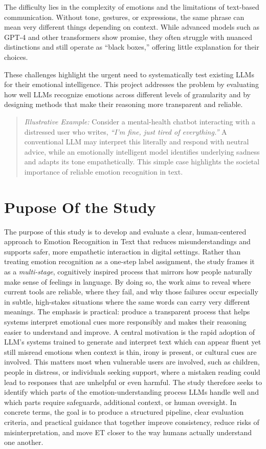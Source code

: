 \noindent The difficulty lies in the complexity of emotions and the limitations of text-based communication. Without tone, gestures, or expressions, the same phrase can mean very different things depending on context. While advanced models such as GPT-4 and other transformers show promise, they often struggle with nuanced distinctions and still operate as “black boxes,” offering little explanation for their choices.  

\noindent These challenges highlight the urgent need to systematically test existing LLMs for their emotional intelligence. This project addresses the problem by evaluating how well LLMs recognize emotions across different levels of granularity and by designing methods that make their reasoning more transparent and reliable.  

\begin{quote}
\textit{Illustrative Example:} Consider a mental-health chatbot interacting with a distressed user who writes, 
\textit{“I’m fine, just tired of everything.”} 
A conventional LLM may interpret this literally and respond with neutral advice, 
while an emotionally intelligent model identifies underlying sadness and adapts its tone empathetically. 
This simple case highlights the societal importance of reliable emotion recognition in text.
\end{quote}


\section{Pupose Of the Study}
The purpose of this study is to develop and evaluate a clear, human-centered approach to Emotion Recognition in Text  that reduces misunderstandings and supports safer, more empathetic interaction in digital settings. Rather than treating emotion recognition as a one-step label assignment, the study frames it as a \textit{multi-stage}, cognitively inspired process that mirrors how people naturally make sense of feelings in language. By doing so, the work aims to reveal where current tools are reliable, where they fail, and why those failures occur especially in subtle, high-stakes situations where the same words can carry very different meanings. The emphasis is practical: produce a transparent process that helps systems interpret emotional cues more responsibly and makes their reasoning easier to understand and improve.
\smallskip
\noindent A central motivation is the rapid adoption of LLM's systems trained to generate and interpret text which can appear fluent yet still misread emotions when context is thin, irony is present, or cultural cues are involved. This matters most when vulnerable users are involved, such as children, people in distress, or individuals seeking support, where a mistaken reading could lead to responses that are unhelpful or even harmful. The study therefore seeks to identify which parts of the emotion-understanding process LLMs handle well and which parts require safeguards, additional context, or human oversight. In concrete terms, the goal is to produce a structured pipeline, clear evaluation criteria, and practical guidance that together improve consistency, reduce risks of misinterpretation, and move ET closer to the way humans actually understand one another.
